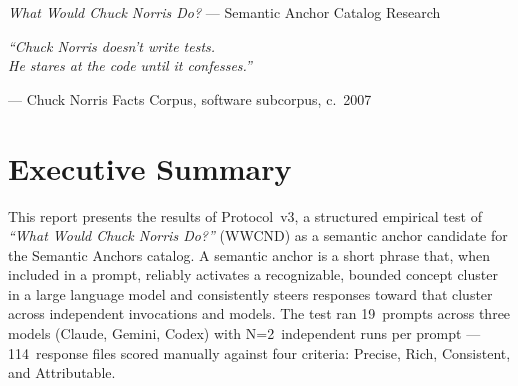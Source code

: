 \documentclass[10.5pt,a4paper]{article}
\begin{document}
\vfill

\begin{center}
{\color{white!40}\small\lightfont
\textit{What Would Chuck Norris Do?} — Semantic Anchor Catalog Research}
\end{center}

\newpage
\nopagecolor

\setcounter{tocdepth}{2}
\renewcommand{\contentsname}{%
  \serifheading\large\bfseries\color{midnavy}Contents}
\tableofcontents
\newpage

\vspace*{1.8cm}
\begin{center}
  \begin{minipage}{0.72\textwidth}
    \centering
    {\color{dimgray}\lightfont\small\itshape
    ``Chuck Norris doesn't write tests.\\
    He stares at the code until it confesses.''}

    \medskip
    {\color{dimgray!70}\fontsize{8}{10}\selectfont\lightfont
    — Chuck Norris Facts Corpus, software subcorpus, c.~2007}
  \end{minipage}
\end{center}
\vspace{1.4cm}

\section{Executive Summary}

This report presents the results of Protocol~v3, a structured empirical test of
\textit{``What Would Chuck Norris Do?''} (WWCND) as a semantic anchor candidate for the
Semantic Anchors catalog. A semantic anchor is a short phrase that, when included in a
prompt, reliably activates a recognizable, bounded concept cluster in a large language model
and consistently steers responses toward that cluster across independent invocations and models.
The test ran 19~prompts across three models (Claude, Gemini, Codex) with N=2~independent
runs per prompt — 114~response files scored manually against four criteria:
Precise, Rich, Consistent, and Attributable.
\end{document}
